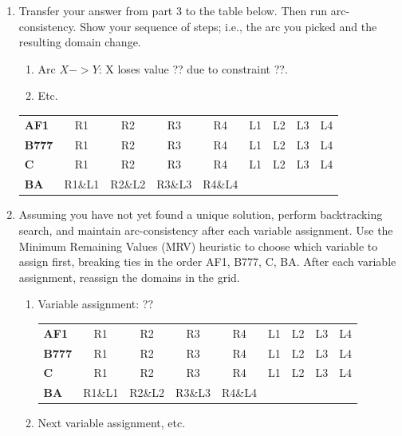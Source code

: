 \documentclass[12pt]{article}
\begin{document}
\begin{enumerate}
\item Transfer your answer from part 3 to the table below. Then run
  arc-consistency.  Show your sequence of steps; i.e., the arc you
  picked and the resulting domain change.

  \begin{enumerate}

  \item Arc $X->Y$:  X loses value ?? due to constraint ??.

  \item Etc.
 
  \end{enumerate}

\begin{center}\begin{tabular}{l|cccccccc|}
{\bf AF1}  & R1 & R2 & R3 & R4 & L1 & L2 & L3 & L4 \\ 
{\bf B777} & R1 & R2 & R3 & R4 & L1 & L2 & L3 & L4 \\ 
{\bf C}    & R1 & R2 & R3 & R4 & L1 & L2 & L3 & L4 \\ 
{\bf BA}   & R1\&L1 & R2\&L2 & R3\&L3 & R4\&L4 &  &  &  &  \\ 
\end{tabular}\end{center}

\item Assuming you have not yet found a unique solution, perform
  backtracking search, and maintain arc-consistency after each
  variable assignment. Use the Minimum Remaining Values (MRV)
  heuristic to choose which variable to assign first, breaking ties in
  the order AF1, B777, C, BA.  After each variable assignment,
  reassign the domains in the grid.

  \begin{enumerate}

  \item Variable assignment:  ??

\begin{center}\begin{tabular}{l|cccccccc|}
{\bf AF1}  & R1 & R2 & R3 & R4 & L1 & L2 & L3 & L4 \\ 
{\bf B777} & R1 & R2 & R3 & R4 & L1 & L2 & L3 & L4 \\ 
{\bf C}    & R1 & R2 & R3 & R4 & L1 & L2 & L3 & L4 \\ 
{\bf BA}   & R1\&L1 & R2\&L2 & R3\&L3 & R4\&L4 &  &  &  &  \\ 
\end{tabular}\end{center}

   \item Next variable assignment, etc.

   \end{enumerate}

\end{enumerate}
\end{document}
